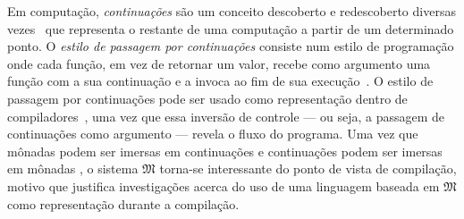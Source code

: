 \vspace{.5\baselineskip}
Em computação, \emph{continuações} são um conceito descoberto e redescoberto diversas vezes~\citep{Reynolds.1993} que representa o restante de uma computação a partir de um determinado ponto.
O \emph{estilo de passagem por continuações} consiste num estilo de programação onde cada função, em vez de retornar um valor, recebe como argumento uma função com a sua continuação e a invoca ao fim de sua execução~\citep{Thielecke.1999}.
O estilo de passagem por continuações pode ser usado como representação dentro de compiladores~\citep{Appel.1991}, uma vez que essa inversão de controle --- ou seja, a passagem de continuações como argumento --- revela o fluxo do programa.
Uma vez que mônadas podem ser imersas em continuações e continuações podem ser imersas em mônadas \citep{Filinski.1994}, o sistema $\mathfrak{M}$ torna-se interessante do ponto de vista de compilação, motivo que justifica investigações acerca do uso de uma linguagem baseada em $\mathfrak{M}$ como representação durante a compilação.
